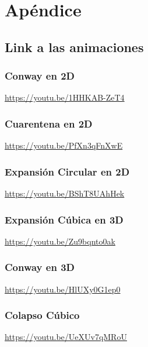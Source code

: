 \section*{Apéndice}

\subsection{Link a las animaciones}\label{subsec:link-animaciones}

\begin{appendices}
    \subsubsection{Conway en 2D}\label{subsubsec:conway-en-2d-link}
    \url{https://youtu.be/1HHKAB-ZeT4}
    \subsubsection{Cuarentena en 2D}\label{subsubsec:cuarentena-2d-link}
    \url{https://youtu.be/PfXn3qFnXwE}
    \subsubsection{Expansión Circular en 2D}\label{subsubsec:expansion-circular-2d-link}
    \url{https://youtu.be/BShT8UAhHek}
    \subsubsection{Expansión Cúbica en 3D}\label{subsubsec:cubito-3d-link}
    \url{https://youtu.be/Zu9bqnto0ak}
    \subsubsection{Conway en 3D}\label{subsubsec:conway-en-3d-link}
    \url{https://youtu.be/HlUXy0G1ep0}
    \subsubsection{Colapso Cúbico}\label{subsubsec:colapso-cubico-link}
    \url{https://youtu.be/UeXUv7qMRoU}
\end{appendices}

